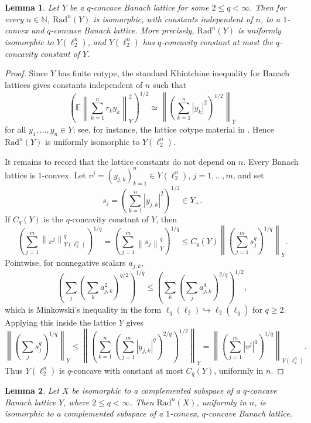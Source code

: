 \documentclass[11pt]{article}
\newtheorem{lemma}{Lemma}
\newcommand{\N}{\mathbb N}
\newcommand{\Rad}{\mathrm{Rad}}
\newcommand{\norm}[1]{\left\|#1\right\|}
\begin{document}
\begin{lemma}\label{lem:rad-lattice}
Let \(Y\) be a \(q\)-concave Banach lattice for some \(2\le q<\infty\).  Then
for every \(n\in\N\), \(\Rad^n(Y)\) is isomorphic, with constants independent
of \(n\), to a \(1\)-convex and \(q\)-concave Banach lattice.  More precisely,
\(\Rad^n(Y)\) is uniformly isomorphic to \(Y(\ell_2^n)\), and
\(Y(\ell_2^n)\) has \(q\)-concavity constant at most the \(q\)-concavity
constant of \(Y\).
\end{lemma}

\begin{proof}
Since \(Y\) has finite cotype, the standard Khintchine inequality for Banach
lattices gives constants independent of \(n\) such that
\[
        \left(\mathbb E\norm{\sum_{k=1}^n r_k y_k}_Y^2\right)^{1/2}
        \simeq
        \norm{\left(\sum_{k=1}^n |y_k|^2\right)^{1/2}}_Y
\]
for all \(y_1,\ldots,y_n\in Y\); see, for instance, the lattice cotype
material in \cite{LT}.  Hence \(\Rad^n(Y)\) is uniformly isomorphic to
\(Y(\ell_2^n)\).

It remains to record that the lattice constants do not depend on \(n\).  Every
Banach lattice is \(1\)-convex.  Let \(v^j=(y_{j,k})_{k=1}^n\in Y(\ell_2^n)\),
\(j=1,\ldots,m\), and set
\[
        s_j=\left(\sum_{k=1}^n |y_{j,k}|^2\right)^{1/2}\in Y_+.
\]
If \(C_q(Y)\) is the \(q\)-concavity constant of \(Y\), then
\[
        \left(\sum_{j=1}^m \norm{v^j}_{Y(\ell_2^n)}^q\right)^{1/q}
        =
        \left(\sum_{j=1}^m \norm{s_j}_{Y}^q\right)^{1/q}
        \le
        C_q(Y)\norm{\left(\sum_{j=1}^m s_j^q\right)^{1/q}}_Y.
\]
Pointwise, for nonnegative scalars \(a_{j,k}\),
\[
        \left(\sum_j\left(\sum_k a_{j,k}^2\right)^{q/2}\right)^{1/q}
        \le
        \left(\sum_k\left(\sum_j a_{j,k}^q\right)^{2/q}\right)^{1/2},
\]
which is Minkowski's inequality in the form
\(\ell_q(\ell_2)\hookrightarrow \ell_2(\ell_q)\) for \(q\ge2\).  Applying this
inside the lattice \(Y\) gives
\[
        \norm{\left(\sum_j s_j^q\right)^{1/q}}_Y
        \le
        \norm{\left(\sum_{k=1}^n
        \left(\sum_{j=1}^m |y_{j,k}|^q\right)^{2/q}\right)^{1/2}}_Y
        =
        \norm{\left(\sum_{j=1}^m |v^j|^q\right)^{1/q}}_{Y(\ell_2^n)}.
\]
Thus \(Y(\ell_2^n)\) is \(q\)-concave with constant at most \(C_q(Y)\),
uniformly in \(n\).
\end{proof}

\begin{lemma}\label{lem:complemented-rad}
Let \(X\) be isomorphic to a complemented subspace of a \(q\)-concave Banach
lattice \(Y\), where \(2\le q<\infty\).  Then \(\Rad^n(X)\), uniformly in
\(n\), is isomorphic to a complemented subspace of a \(1\)-convex,
\(q\)-concave Banach lattice.
\end{lemma}
\end{document}
